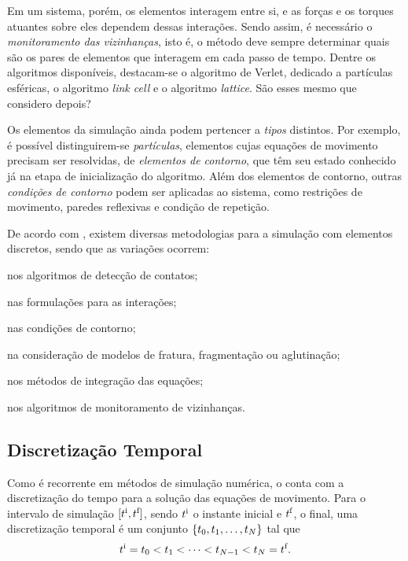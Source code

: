 Em um sistema, porém, os elementos interagem entre si, e as forças e os torques atuantes sobre eles dependem dessas interações. Sendo assim, é necessário o \textit{monitoramento das vizinhanças}, isto é, o método deve sempre determinar quais são os pares de elementos que interagem em cada passo de tempo. Dentre os algoritmos disponíveis, destacam-se o algoritmo de Verlet, dedicado a partículas esféricas, o algoritmo \textit{link cell} e o algoritmo \textit{lattice}. \alert{São esses mesmo que considero depois?}

Os elementos da simulação ainda podem pertencer a \textit{tipos} distintos. Por exemplo, é possível distinguirem-se \textit{partículas}, elementos cujas equações de movimento precisam ser resolvidas, de \textit{elementos de contorno}, que têm seu estado conhecido já na etapa de inicialização do algoritmo. Além dos elementos de contorno, outras \textit{condições de contorno} podem ser aplicadas ao sistema, como restrições de movimento, paredes reflexivas e condição de repetição.

De acordo com , existem diversas metodologias para a simulação com elementos discretos, sendo que as variações ocorrem:
\begin{alineas}
	\item nos algoritmos de detecção de contatos;
	\item nas formulações para as interações;
	\item nas condições de contorno;
	\item na consideração de modelos de fratura, fragmentação ou aglutinação;
	\item nos métodos de integração das equações;
	\item nos algoritmos de monitoramento de vizinhanças.
\end{alineas}

\subsection{Discretização Temporal}

Como é recorrente em métodos de simulação numérica, o \DEM{} conta com a discretização do tempo para a solução das equações de movimento. Para o intervalo de simulação \(\interval{\initialInstant}{\finalInstant}\), sendo \(\initialInstant\) o instante inicial e \(\finalInstant\), o final, uma discretização temporal é um conjunto \(\left\lbrace t_0, t_1, \dotsc, t_{N} \right\rbrace\) tal que
\begin{equation*}
	\initialInstant = \instant[0] < \instant[1] < \dotsb < \instant[\numberOfTimesteps - 1] < \instant[\numberOfTimesteps] = \finalInstant.
\end{equation*}

